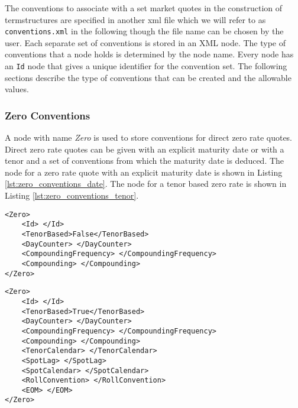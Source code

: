 The conventions to associate with a set market quotes in the construction of termstructures are specified in another xml file which we will refer to as 
{\tt conventions.xml} in the following though the file name can be chosen by the user. 
Each separate set of conventions is stored in an XML node. The type of conventions 
that a node holds is determined by the node name. Every node has an \lstinline!Id! node that gives a unique identifier for 
the convention set. The following sections describe the type of conventions that can be created and the allowable values.

\subsubsection{Zero Conventions}
A node with name \emph{Zero} is used to store conventions for direct zero rate quotes. Direct zero rate quotes can be 
given with an explicit maturity date or with a tenor and a set of conventions from which the maturity date is deduced. The 
node for a zero rate quote with an explicit maturity date is shown in Listing \ref{lst:zero_conventions_date}. The node 
for a tenor based zero rate is shown in Listing \ref{lst:zero_conventions_tenor}.

{\footnotesize
\begin{lstlisting}[caption={Zero conventions, explicit maturity date}, label=lst:zero_conventions_date]
<Zero>
	<Id> </Id>
	<TenorBased>False</TenorBased>
	<DayCounter> </DayCounter>
	<CompoundingFrequency> </CompoundingFrequency>
	<Compounding> </Compounding>
</Zero>
\end{lstlisting}
}

{\footnotesize
\begin{lstlisting}[caption={Zero conventions, tenor based}, label=lst:zero_conventions_tenor]
<Zero>
	<Id> </Id>
	<TenorBased>True</TenorBased>
	<DayCounter> </DayCounter>
	<CompoundingFrequency> </CompoundingFrequency>
	<Compounding> </Compounding>
	<TenorCalendar> </TenorCalendar>
	<SpotLag> </SpotLag>
	<SpotCalendar> </SpotCalendar>
	<RollConvention> </RollConvention>
	<EOM> </EOM>
</Zero>
\end{lstlisting}
}

